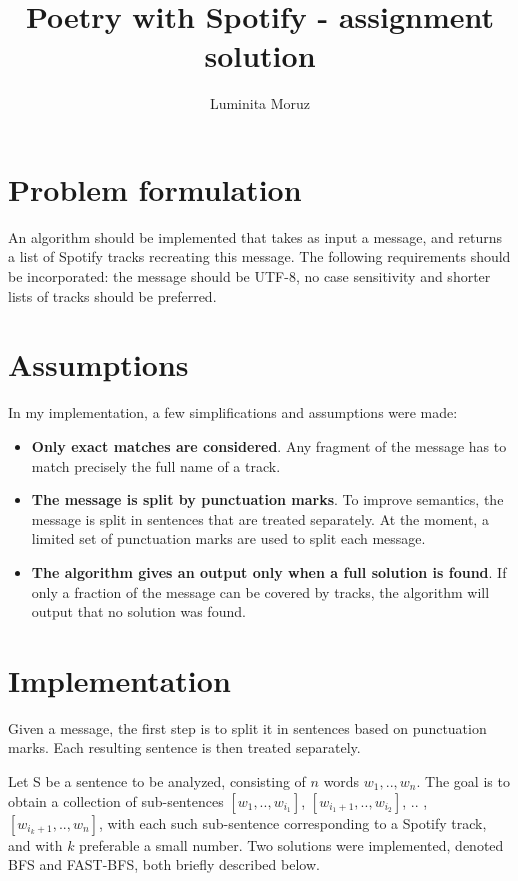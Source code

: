\documentclass[12pt]{article}
\title{{\bf Poetry with Spotify - assignment solution}}
\author{
Luminita Moruz  \\
}
\begin{document}
\maketitle

\section{Problem formulation}
\label{sec:problem}
An algorithm should be implemented that takes as input a message, and
returns a list of Spotify tracks recreating this message. The
following requirements should be incorporated: the message should be
UTF-8, no case sensitivity and shorter lists of tracks should be
preferred.


\section{Assumptions}
In my implementation, a few simplifications and assumptions were made:
\begin{itemize}
\item {\bf Only exact matches are considered}. Any fragment of the
  message has to match precisely the full name of a track.

\item {\bf The message is split by punctuation marks}. To improve
  semantics, the message is split in sentences that are treated
  separately. At the moment, a limited set of punctuation marks are
  used to split each message. 

\item {\bf The algorithm gives an output only when a full solution is
  found}. If only a fraction of the message can be covered by tracks,
  the algorithm will output that no solution was found.
\end{itemize}
 

\section{Implementation}
Given a message, the first step is to split it in sentences based on
punctuation marks. Each resulting sentence is then treated separately.

Let S be a sentence to be analyzed, consisting of $n$ words $w_1, ..,
w_n$.  The goal is to obtain a collection of sub-sentences $[w_1, ..,
  w_{i_1}]$, $[w_{i_1+1}, .., w_{i_2}]$, $..$ , $[w_{i_k+1}, ..,
  w_n]$, with each such sub-sentence corresponding to a Spotify track,
and with $k$ preferable a small number. Two solutions were
implemented, denoted BFS and FAST-BFS, both briefly described below.
\end{document}
